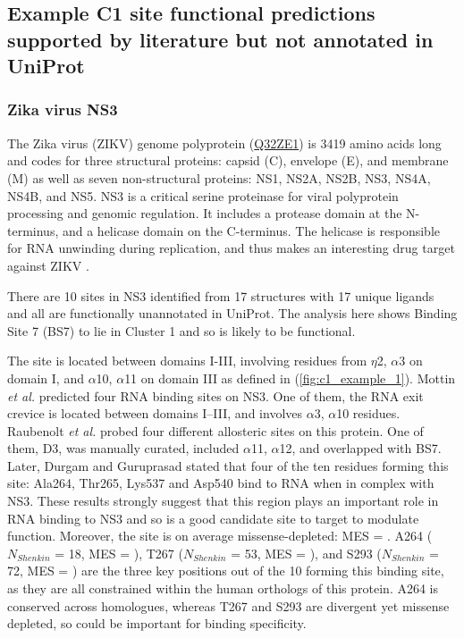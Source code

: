 \subsection{Example C1 site functional predictions supported by literature but not annotated in UniProt}

\subsubsection{Zika virus NS3}

The Zika virus (ZIKV) genome polyprotein (\href{https://www.uniprot.org/uniprotkb/Q32ZE1/entry}{Q32ZE1}) is 3419 amino acids long and codes for three structural proteins: capsid (C), envelope (E), and membrane (M) as well as seven non-structural proteins: NS1, NS2A, NS2B, NS3, NS4A, NS4B, and NS5. NS3 is a critical serine proteinase for viral polyprotein processing and genomic regulation. It includes a protease domain at the N-terminus, and a helicase domain on the C-terminus. The helicase is responsible for RNA unwinding during replication, and thus makes an interesting drug target against ZIKV \cite{LUO_2015_FLAVIVIRUS}.

There are 10 sites in NS3 identified from 17 structures with 17 unique ligands and all are functionally unannotated in UniProt. The analysis here shows Binding Site 7 (BS7) to lie in Cluster 1 and so is likely to be functional.

The site is located between domains I-III, involving residues from $\eta$2, $\alpha$3 on domain I, and $\alpha$10, $\alpha$11 on domain III as defined in \cite{TIAN_2016_ZIKV} (\autoref{fig:c1_example_1}). Mottin \textit{et al.} \cite{MOTTIN_2017_ZIKA_HELICASE} predicted four RNA binding sites on NS3. One of them, the RNA exit crevice is located between domains I–III, and involves $\alpha$3, $\alpha$10 residues. Raubenolt \textit{et al.} \cite{RAUBENOLT_2021_ZIKA_ALLOSTERIC} probed four different allosteric sites on this protein. One of them, D3, was manually curated, included $\alpha$11, $\alpha$12, and overlapped with BS7. Later, Durgam and Guruprasad \cite{DURGAM_2022_ZIKA_ATP} stated that four of the ten residues forming this site: Ala264, Thr265, Lys537 and Asp540 bind to RNA when in complex with NS3. These results strongly suggest that this region plays an important role in RNA binding to NS3 and so is a good candidate site to target to modulate function. Moreover, the site is on average missense-depleted: MES =  . A264 ($N_{Shenkin}$ = 18, MES = ), T267 ($N_{Shenkin}$ = 53, MES = ), and S293 ($N_{Shenkin}$ = 72, MES =  ) are the three key positions out of the 10 forming this binding site, as they are all constrained within the human orthologs of this protein. A264 is conserved across homologues, whereas T267 and S293 are divergent yet missense depleted, so could be important for binding specificity.

